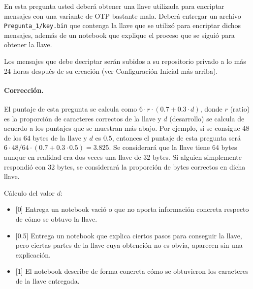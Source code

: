 
En esta pregunta usted deberá obtener una llave utilizada para encriptar mensajes con una variante de OTP bastante mala. Deberá entregar un archivo \texttt{Pregunta\_1/key.bin} que contenga la llave que se utilizó para encriptar dichos mensajes, además de un notebook que explique el proceso que se siguió para obtener la llave.

Los mensajes que debe decriptar serán subidos a su repositorio privado a lo más 24 horas después de su creación (ver Configuración Inicial más arriba).

\medskip

\paragraph{Corrección.}
El puntaje de esta pregunta se calcula como $6\cdot r\cdot (0.7 + 0.3\cdot d)$, donde $r$ (ratio) es la proporción de caracteres correctos de la llave y $d$ (desarrollo) se calcula de acuerdo a los puntajes que se muestran más abajo. Por ejemplo, si se consigue 48 de los 64 bytes de la llave y $d$ es $0.5$, entonces el puntaje de esta pregunta será  $6\cdot 48/64 \cdot (0.7 + 0.3\cdot 0.5) = 3.825$. Se considerará que la llave tiene 64 bytes aunque en realidad era dos veces una llave de 32 bytes. Si alguien simplemente respondió con 32 bytes, se considerará la proporción de bytes correctos en dicha llave.

Cálculo del valor $d$:
\begin{itemize}
  \item{[0]} Entrega un notebook vació o que no aporta información concreta respecto de cómo se obtuvo la llave.
  \item{[0.5]} Entrega un notebook que explica ciertos pasos para conseguir la llave, pero ciertas partes de la llave cuya obtención no es obvia, aparecen sin una explicación.
  \item{[1]} El notebook describe de forma concreta cómo se obtuvieron los caracteres de la llave entregada.
\end{itemize}

\medskip
